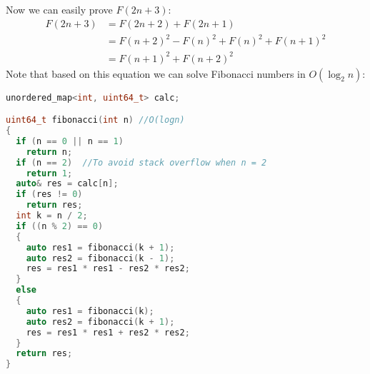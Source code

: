 \documentclass{book}
\begin{document}
	Now we can easily prove $F(2n + 3)$:
	\begin{equation*}
		\begin{split}
			F(2n + 3) &= F(2n + 2) + F(2n + 1) \\
			&= F(n + 2)^2 - F(n)^2 + F(n)^2 + F(n + 1)^2 \\
			&= F(n + 1)^2 + F(n + 2)^2
		\end{split}
	\end{equation*}
	Note that based on this equation we can solve Fibonacci numbers in $O(\log_2{n})$:
	\begin{lstlisting}[language=c++, frame=single]
unordered_map<int, uint64_t> calc;

uint64_t fibonacci(int n) //O(logn)
{
  if (n == 0 || n == 1)
    return n;
  if (n == 2)  //To avoid stack overflow when n = 2
    return 1;
  auto& res = calc[n];
  if (res != 0)
    return res;
  int k = n / 2;
  if ((n % 2) == 0)
  {
    auto res1 = fibonacci(k + 1);
    auto res2 = fibonacci(k - 1);
    res = res1 * res1 - res2 * res2;
  }
  else
  {
    auto res1 = fibonacci(k);
    auto res2 = fibonacci(k + 1);
    res = res1 * res1 + res2 * res2;
  }
  return res;
}
	\end{lstlisting}
\end{document}
